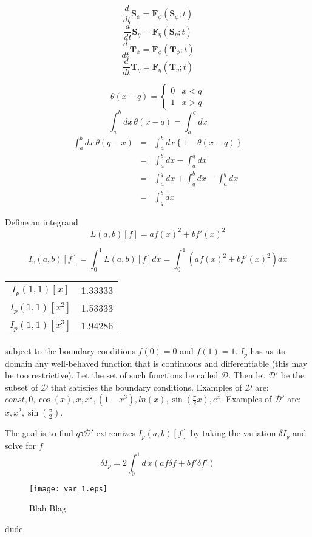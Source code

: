 \documentclass[10pt]{article}
\begin{document}
\[
  \frac{d}{d t} {\mathbf S}_\phi = {\mathbf F}_\phi \left( {\mathbf S}_{\phi} ; t \right)
\]
\[
  \frac{d}{d t} {\mathbf S}_\eta = {\mathbf F}_\eta \left( {\mathbf S}_\eta ; t \right)
\]
\[
  \frac{d}{d t} {\mathbf T}_\phi = {\mathbf F}_\phi \left( {\mathbf T}_\phi ; t \right)
\]
\[
  \frac{d}{d t} {\mathbf T}_\eta = {\mathbf F}_\eta \left( {\mathbf T}_\eta ; t \right)
\]

\[
  \theta(x - q) = \left\{ \begin{array}{ll} 0 & x < q \\ 1 & x > q \end{array} \right.
\]
\[
 \int_{a}^{b} dx \, \theta(x-q) = \int_{a}^{q} d x
\]
\begin{eqnarray*}
 \int_{a}^{b} dx \, \theta(q - x)	& = & \int_{a}^{b} dx \left\{1 - \theta(x-q) \right\} \\
								& = & \int_{a}^{b} dx - \int_{a}^{q} dx \\
								& = & \int_{a}^{q} dx + \int_{q}^{b} dx - \int_{a}^{q} dx\\
								& = & \int_{q}^{b} dx
\end{eqnarray*}


\newpage
\null

Define an integrand
\[
  L(a,b)[f] = a f(x)^2 + b f'(x)^2
\]

\[
  I_v(a,b)[f] = \int_0^1 L(a,b)[f] dx = \int_0^1 \left( a f(x)^2 + b f'(x)^2 \right) dx
\]

\begin{tabular}{cc}
  $I_p(1,1)\left[x\right]$   & 1.33333 \\
  $I_p(1,1)\left[x^2\right]$ & 1.53333 \\
  $I_p(1,1)\left[x^3\right]$ & 1.94286
\end{tabular}
subject to the boundary conditions $f(0) = 0$ and $f(1) = 1$.
$I_p$ has as its domain any well-behaved function that is continuous and differentiable (this may be 
too restrictive).  Let the set of such functions be called $\mathcal D$.  Then let $\mathcal D'$ be
the subset of $\mathcal D$ that satisfies the boundary conditions.  Examples of $\mathcal D$ are:
$const, 0, \cos(x), x, x^2, (1-x^3), ln(x), \sin \left( \frac{\pi}{2} x \right), e^x$.  Examples
of $\mathcal D'$ are: $x, x^2, \sin \left( \frac{\pi}{2} \right)$.  


The goal is to find
$q \backepsilon {\mathcal D'}$ extremizes $I_p(a,b)[f]$ by taking the variation $\delta I_p$
and solve for $f$
\[
  \delta I_p = 2 \int_0^1 d\,x \left( a f \delta f + b f' \delta f' \right)
\]
\normalsize
\begin{figure}[htpb!]
\centering
\texttt{[image: var\_1.eps]}
\scriptsize\caption{Blah Blag}\label{fig:erptsqfit}
\end{figure}
\newpage
\null
dude
\end{document}
